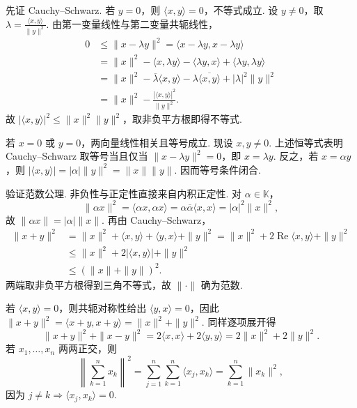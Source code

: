 \begin{FAProof}
先证 Cauchy--Schwarz. 若 \(\displaystyle y=0\)，则 \(\displaystyle \langle x,y\rangle=0\)，不等式成立. 设 \(\displaystyle y\neq0\)，取 \(\displaystyle \lambda=\frac{\langle x,y\rangle}{\|y\|^2}\).
由第一变量线性与第二变量共轭线性，
\begin{align*}
\displaystyle 0&\leqslant\|x-\lambda y\|^2=\langle x-\lambda y,x-\lambda y\rangle\\
&\displaystyle =\|x\|^2-\langle x,\lambda y\rangle-\langle\lambda y,x\rangle+\langle\lambda y,\lambda y\rangle\\
&\displaystyle =\|x\|^2-\overline\lambda\langle x,y\rangle-\lambda\overline{\langle x,y\rangle}+|\lambda|^2\|y\|^2\\[6pt]
&\displaystyle =\|x\|^2-\frac{|\langle x,y\rangle|^2}{\|y\|^2}.
\end{align*}
故 \(\displaystyle |\langle x,y\rangle|^2\leqslant\|x\|^2\|y\|^2\)，取非负平方根即得不等式.

若 \(\displaystyle x=0\) 或 \(\displaystyle y=0\)，两向量线性相关且等号成立. 现设 \(\displaystyle x,y\neq0\). 上述恒等式表明 Cauchy--Schwarz 取等号当且仅当 \(\displaystyle \|x-\lambda y\|^2=0\)，即 \(\displaystyle x=\lambda y\). 反之，若 \(\displaystyle x=\alpha y\)，则 \(\displaystyle |\langle x,y\rangle|=|\alpha|\|y\|^2=\|x\|\|y\|\). 因而等号条件闭合.

验证范数公理. 非负性与正定性直接来自内积正定性. 对 \(\displaystyle \alpha\in\mathbb K\)，
\[
\|\alpha x\|^2
=\langle\alpha x,\alpha x\rangle
=\alpha\overline\alpha\langle x,x\rangle
=|\alpha|^2\|x\|^2,
\]
故 \(\displaystyle \|\alpha x\|=|\alpha|\|x\|\). 再由 Cauchy--Schwarz，
\begin{align*}
\|x+y\|^2
&=\|x\|^2+\langle x,y\rangle+\langle y,x\rangle+\|y\|^2=\|x\|^2+2\operatorname{Re}\langle x,y\rangle+\|y\|^2\\
&\leqslant\|x\|^2+2|\langle x,y\rangle|+\|y\|^2\\
&\leqslant(\|x\|+\|y\|)^2.
\end{align*}
两端取非负平方根得到三角不等式，故 \(\displaystyle \|\cdot\|\) 确为范数.

若 \(\displaystyle \langle x,y\rangle=0\)，则共轭对称性给出 \(\displaystyle \langle y,x\rangle=0\)，因此 \(\displaystyle \|x+y\|^2 =\langle x+y,x+y\rangle =\|x\|^2+\|y\|^2\).
同样逐项展开得
\[
\|x+y\|^2+\|x-y\|^2=2\langle x,x\rangle+2\langle y,y\rangle=2\|x\|^2+2\|y\|^2.
\]
若 \(\displaystyle x_1,\dots,x_n\) 两两正交，则
\[
\left\|\sum_{k=1}^{n}x_k\right\|^2
=\sum_{j=1}^{n}\sum_{k=1}^{n}\langle x_j,x_k\rangle
=\sum_{k=1}^{n}\|x_k\|^2,
\]
因为 \(\displaystyle j\neq k\Rightarrow\langle x_j,x_k\rangle=0\).


\end{FAProof}
